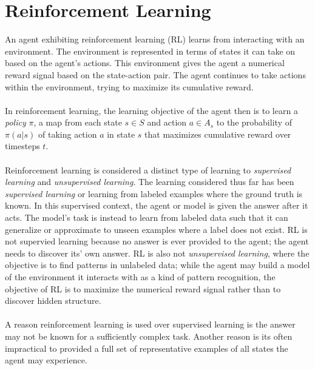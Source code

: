 \section{Reinforcement Learning}
An agent exhibiting reinforcement learning (RL) learns from interacting with an 
environment. 
The environment is represented in terms of states it can take on based on the agent's 
actions. 
This environment gives the agent a numerical reward signal based on the state-action pair.
The agent continues to take actions within the environment, trying to maximize its
cumulative reward.
\\\\
In reinforcement learning, the learning objective of the agent then is to learn 
a \textit{policy} $\pi$, a map from each state $s \in S$ and action $a \in A_{s}$ to 
the probability of $\pi(a|s)$ of taking action $a$ in state $s$ that maximizes cumulative
reward over timesteps $t$.
\\\\
Reinforcement learning is considered a distinct type of learning to \textit{supervised
learning} and \textit{unsupervised learning}. The learning considered thus far has been 
\textit{supervised learning} or learning from labeled examples where the ground truth is known. 
In this supervised context, the agent or model is given the answer after it acts. The 
model's task is instead to learn from labeled data such that it can generalize
or approximate to unseen examples where a label does not exist. 
RL is not supervied learning because no answer is ever provided to the agent; the agent
needs to discover its' own answer. 
RL is also not \textit{unsupervised learning}, where the objective is to find patterns in 
unlabeled data; while the agent may build a model of the environment it interacts with as
a kind of pattern recognition, the objective of RL is to maximize the numerical reward
signal rather than to discover hidden structure.
\\\\
A reason reinforcement learning is used over supervised learning is the answer may not 
be known for a sufficiently complex task. Another reason is its often impractical to 
provided a full set of representative examples of all states the agent may experience.
